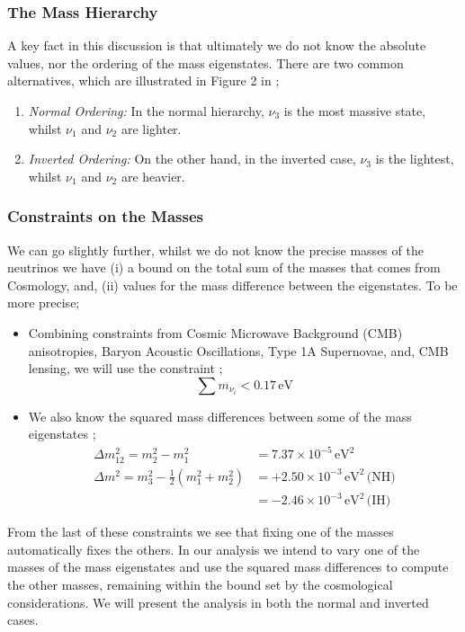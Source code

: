 \subsubsection{The Mass Hierarchy}

A key fact in this discussion is that ultimately we do not know the absolute values, nor the ordering of the mass eigenstates. There are two common alternatives, which are illustrated in Figure 2 in \cite{King};
\begin{enumerate}
  \item \textit{Normal Ordering:} In the normal hierarchy, $\nu_3$ is the most massive state, whilst $\nu_1$ and $\nu_2$ are lighter.
  \item \textit{Inverted Ordering:} On the other hand, in the inverted case, $\nu_3$ is the lightest, whilst $\nu_1$ and $\nu_2$ are heavier.
\end{enumerate}

\subsubsection{Constraints on the Masses}

We can go slightly further, whilst we do not know the precise masses of the neutrinos we have (i) a bound on the total sum of the masses that comes from Cosmology, and, (ii) values for the mass difference between the eigenstates. To be more precise;
\begin{itemize}
  \item Combining constraints from Cosmic Microwave Background (CMB) anisotropies, Baryon Acoustic Oscillations, Type 1A Supernovae, and, CMB lensing, we will use the constraint \cite{Couchot2017};
  \begin{equation}
    \sum{m_{\nu_i}} < 0.17 \, \textrm{eV}
  \end{equation}
  \item We also know the squared mass differences between some of the mass eigenstates \cite{Couchot2017};
  \begin{align}
    \Delta m_{12}^2 = m_2^2 - m_1^2 &= 7.37 \times 10^{-5}\,\textrm{eV}^2 \\
    \Delta m^2 = m_3^2 - \frac{1}{2}(m_1^2 + m_2^2) &= +2.50 \times 10^{-3} \, \textrm{eV}^2\, \textrm{(NH)} \\
    &= -2.46 \times 10^{-3} \, \textrm{eV}^2\, \textrm{(IH)}
  \end{align}
\end{itemize}
From the last of these constraints we see that fixing one of the masses automatically fixes the others. In our analysis we intend to vary one of the masses of the mass eigenstates and use the squared mass differences to compute the other masses, remaining within the bound set by the cosmological considerations. We will present the analysis in both the normal and inverted cases.


